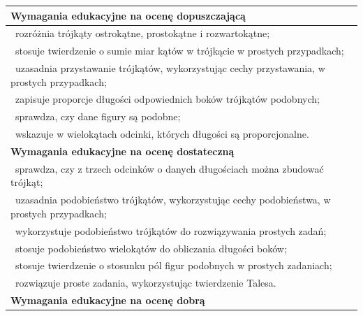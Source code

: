 \documentclass[12pt,a4paper]{article}
\begin{document}
	\begin{longtable}{|p{16cm}|}
		\hline
		
		\textbf{Wymagania edukacyjne na ocenę dopuszczającą} \\ \hline
		
		\textbullet\ rozróżnia trójkąty ostrokątne, prostokątne i rozwartokątne; \\
		
		\textbullet\ stosuje twierdzenie o sumie miar kątów w trójkącie w prostych przypadkach; \\
		
		\textbullet\ uzasadnia przystawanie trójkątów, wykorzystując cechy przystawania, w prostych przypadkach; \\
		
		\textbullet\ zapisuje proporcje długości odpowiednich boków trójkątów podobnych; \\
		
		\textbullet\ sprawdza, czy dane figury są podobne; \\
		
		\textbullet\ wskazuje w wielokątach odcinki, których długości są proporcjonalne. \\ \hline
		
		\textbf{Wymagania edukacyjne na ocenę dostateczną} \\ \hline
		
		\textbullet\ sprawdza, czy z trzech odcinków o danych długościach można zbudować trójkąt; \\
		
		\textbullet\ uzasadnia podobieństwo trójkątów, wykorzystując cechy podobieństwa, w prostych przypadkach; \\
		
		\textbullet\ wykorzystuje podobieństwo trójkątów do rozwiązywania prostych zadań; \\
		
		\textbullet\ stosuje podobieństwo wielokątów do obliczania długości boków; \\
		
		\textbullet\ stosuje twierdzenie o stosunku pól figur podobnych w prostych zadaniach; \\
		
		\textbullet\ rozwiązuje proste zadania, wykorzystując twierdzenie Talesa. \\ \hline
		
		\textbf{Wymagania edukacyjne na ocenę dobrą} \\ \hline
		

\end{longtable}
\end{document}
